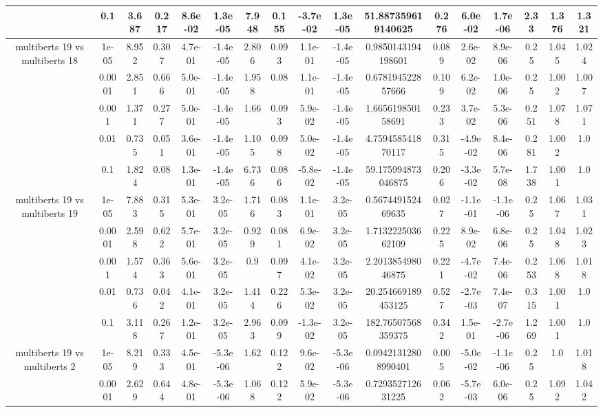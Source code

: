 \begin{tabular}{|c|c|c|c|c|c|c|c|c|c|c|c|c|c|c|c|c|}
 & 0.1 & 3.687 & 0.217 & 8.6e-02 & 1.3e-05 & 7.948 & 0.155 & -3.7e-02 & 1.3e-05 & 51.887359619140625 & 0.276 & 6.0e-02 & 1.7e-06 & 2.33 & 1.376 & 1.321 \\
\hline
\multirow{5}{*}{multiberts 19 vs multiberts 18} & 1e-05 & 8.952 & 0.307 & 4.7e-01 & -1.4e-05 & 2.806 & 0.093 & 1.1e-01 & -1.4e-05 & 0.9850143194198601 & 0.089 & 2.6e-02 & 8.9e-06 & 0.25 & 1.045 & 1.024 \\
 & 0.0001 & 2.851 & 0.666 & 5.0e-01 & -1.4e-05 & 1.958 & 0.08 & 1.1e-01 & -1.4e-05 & 0.678194522857666 & 0.109 & 6.2e-02 & 1.0e-06 & 0.25 & 1.002 & 1.007 \\
 & 0.001 & 1.371 & 0.277 & 5.0e-01 & -1.4e-05 & 1.66 & 0.093 & 5.9e-02 & -1.4e-05 & 1.665619850158691 & 0.233 & 3.7e-02 & 5.3e-06 & 0.251 & 1.078 & 1.071 \\
 & 0.01 & 0.735 & 0.051 & 3.6e-01 & -1.4e-05 & 1.105 & 0.098 & 5.0e-02 & -1.4e-05 & 4.759458541870117 & 0.315 & -4.9e-02 & 8.4e-06 & 0.281 & 1.002 & 1.0 \\
 & 0.1 & 1.824 & 0.08 & 1.3e-01 & -1.4e-05 & 6.736 & 0.086 & -5.8e-02 & -1.4e-05 & 59.175994873046875 & 0.206 & -3.3e-02 & 5.7e-08 & 1.738 & 1.001 & 1.0 \\
\hline
\multirow{5}{*}{multiberts 19 vs multiberts 19} & 1e-05 & 7.883 & 0.315 & 5.3e-01 & 3.2e-05 & 1.716 & 0.083 & 1.1e-01 & 3.2e-05 & 0.567449152469635 & 0.027 & -1.1e-01 & -1.1e-06 & 0.25 & 1.067 & 1.031 \\
 & 0.0001 & 2.598 & 0.622 & 5.7e-01 & 3.2e-05 & 0.929 & 0.081 & 6.9e-02 & 3.2e-05 & 1.713222503662109 & 0.225 & 8.9e-02 & 6.8e-06 & 0.25 & 1.048 & 1.023 \\
 & 0.001 & 1.574 & 0.363 & 5.6e-01 & 3.2e-05 & 0.9 & 0.097 & 4.1e-02 & 3.2e-05 & 2.201385498046875 & 0.221 & -4.7e-02 & 7.4e-06 & 0.253 & 1.068 & 1.018 \\
 & 0.01 & 0.736 & 0.042 & 4.1e-01 & 3.2e-05 & 1.414 & 0.226 & 5.3e-02 & 3.2e-05 & 20.254669189453125 & 0.527 & -2.7e-03 & 7.4e-07 & 0.315 & 1.001 & 1.0 \\
 & 0.1 & 3.118 & 0.267 & 1.2e-01 & 3.2e-05 & 2.963 & 0.099 & -1.3e-02 & 3.2e-05 & 182.76507568359375 & 0.342 & 1.5e-01 & -2.7e-06 & 1.269 & 1.001 & 1.0 \\
\hline
\multirow{5}{*}{multiberts 19 vs multiberts 2} & 1e-05 & 8.219 & 0.333 & 4.5e-01 & -5.3e-06 & 1.62 & 0.122 & 9.6e-02 & -5.3e-06 & 0.09421312808990401 & 0.005 & -5.0e-02 & -1.1e-06 & 0.25 & 1.0 & 1.018 \\
 & 0.0001 & 2.629 & 0.644 & 4.8e-01 & -5.3e-06 & 1.068 & 0.122 & 5.9e-02 & -5.3e-06 & 0.729352712631225 & 0.062 & -5.7e-03 & 6.0e-06 & 0.25 & 1.092 & 1.042 \\

\end{tabular}
